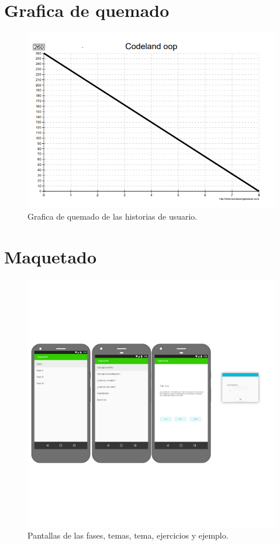 \section{Grafica de quemado}
\begin{figure}[H]
	\begin{center}
		\includegraphics[scale=0.7]{img/quemado.png} 
		\caption{Grafica de quemado de las historias de usuario.}
		\label{quemado}
	\end{center}
\end{figure}

\section{Maquetado}
\begin{figure}[H]
\begin{center}
\includegraphics[scale=0.2]{img/pantallas1.png} 
\end{center}
\caption{Pantallas de las fases, temas, tema, ejercicios y ejemplo.}
\end{figure}


